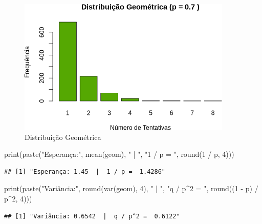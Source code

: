 \documentclass[
]{article}
\newenvironment{Shaded}{\begin{snugshade}}{\end{snugshade}}
\newcommand{\DecValTok}[1]{\textcolor[rgb]{0.00,0.00,0.81}{#1}}
\newcommand{\FunctionTok}[1]{\textcolor[rgb]{0.00,0.00,0.00}{#1}}
\newcommand{\NormalTok}[1]{#1}
\newcommand{\SpecialCharTok}[1]{\textcolor[rgb]{0.00,0.00,0.00}{#1}}
\newcommand{\StringTok}[1]{\textcolor[rgb]{0.31,0.60,0.02}{#1}}
\begin{document}
\begin{figure}

{\centering \includegraphics{7_activity_files/figure-latex/geom-plot-1} 

}

\caption{Distribuição Geométrica}\label{fig:geom-plot}
\end{figure}
\newpage

\begin{Shaded}
\begin{Highlighting}[]
\FunctionTok{print}\NormalTok{(}\FunctionTok{paste}\NormalTok{(}\StringTok{"Esperança:"}\NormalTok{, }\FunctionTok{mean}\NormalTok{(geom), }\StringTok{" | "}\NormalTok{, }\StringTok{"1 / p = "}\NormalTok{, }\FunctionTok{round}\NormalTok{(}\DecValTok{1} \SpecialCharTok{/}\NormalTok{ p, }\DecValTok{4}\NormalTok{)))}
\end{Highlighting}
\end{Shaded}

\begin{verbatim}
## [1] "Esperança: 1.45  |  1 / p =  1.4286"
\end{verbatim}

\begin{Shaded}
\begin{Highlighting}[]
\FunctionTok{print}\NormalTok{(}\FunctionTok{paste}\NormalTok{(}\StringTok{"Variância:"}\NormalTok{, }\FunctionTok{round}\NormalTok{(}\FunctionTok{var}\NormalTok{(geom), }\DecValTok{4}\NormalTok{), }\StringTok{" | "}\NormalTok{, }\StringTok{"q / p\^{}2 = "}\NormalTok{, }\FunctionTok{round}\NormalTok{((}\DecValTok{1} \SpecialCharTok{{-}}\NormalTok{ p) }\SpecialCharTok{/}\NormalTok{ p}\SpecialCharTok{\^{}}\DecValTok{2}\NormalTok{, }\DecValTok{4}\NormalTok{)))}
\end{Highlighting}
\end{Shaded}

\begin{verbatim}
## [1] "Variância: 0.6542  |  q / p^2 =  0.6122"
\end{verbatim}
\end{document}
